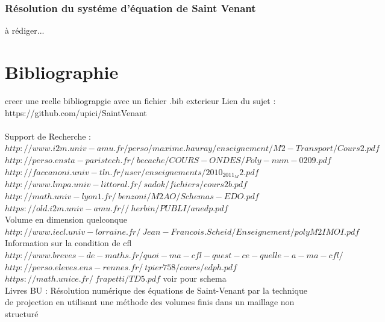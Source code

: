 \documentclass[12pt]{article}
\begin{document}
\subsubsection{Résolution du systéme d'équation de Saint Venant}
à rédiger...

\section{Bibliographie}
creer une reelle bibliograpgie avec un fichier .bib exterieur
\noindent Lien du sujet : https://github.com/upici/SaintVenant
\\
\\Support de Recherche : $http://www.i2m.univ-amu.fr/perso/maxime.hauray/enseignement/M2-Transport/Cours2.pdf$
\\$http://perso.ensta-paristech.fr/~becache/COURS-ONDES/Poly-num-0209.pdf$
\\$http://faccanoni.univ-tln.fr/user/enseignements/2010_2011_M2.pdf$
\\$http://www.lmpa.univ-littoral.fr/~sadok/fichiers/cours2b.pdf$
\\$http://math.univ-lyon1.fr/~benzoni/M2AO/Schemas-EDO.pdf$
\\$https://old.i2m.univ-amu.fr//~herbin/PUBLI/anedp.pdf$
\\Volume en dimension quelconque
\\$http://www.iecl.univ-lorraine.fr/~Jean-Francois.Scheid/Enseignement/polyM2IMOI.pdf$
\\Information sur la condition de cfl
\\$http://www.breves-de-maths.fr/quoi-ma-cfl-quest-ce-quelle-a-ma-cfl/$
\\$http://perso.eleves.ens-rennes.fr/~tpier758/cours/edph.pdf$
\\$https://math.unice.fr/~frapetti/TD5.pdf$ voir pour schema
\\Livres BU : Résolution numérique des équations de Saint-Venant par la technique de projection en utilisant une méthode des volumes finis dans un maillage non structuré 



\end{document}
